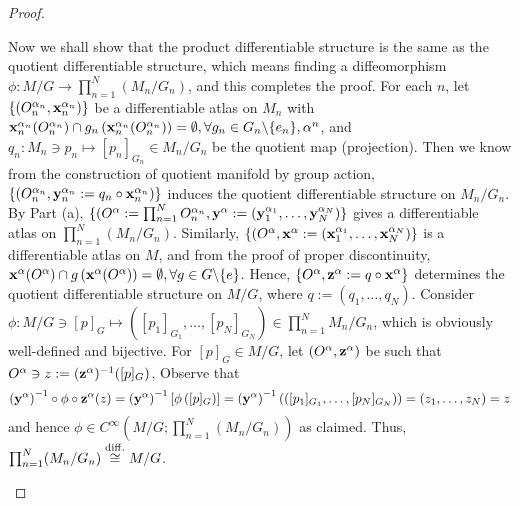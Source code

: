 {\begin{proof}
\begin{enumerate}[(a)]
	Now we shall show that the product differentiable structure is the same as the quotient differentiable structure, which means finding a diffeomorphism $\phi: M/G \rightarrow \prod_{n=1}^N (M_n/G_n)$, and this completes the proof. For each $n$, let $\{(O_n^{\alpha_n}, \mathbf{x}_n^{\alpha_n})\}$ be a differentiable atlas on $M_n$ with	$ \mathbf{x}_n^{\alpha_n}(O_n^{\alpha_n}) \cap g_n\left(\mathbf{x}_n^{\alpha_n}(O_n^{\alpha_n})\right) = \emptyset, \forall g_n \in G_n\backslash\{e_n\}, \alpha^n$, and ${ q_n: M_n \ni p_n \mapsto [p_n]_{G_n} \in M_n/G_n }$ be the quotient map (projection). Then we know from the construction of quotient manifold by group action, $\{(O_n^{\alpha_n}, \mathbf{y}_n^{\alpha_n}:= q_n \circ \mathbf{x}_n^{\alpha_n})\}$ induces the quotient differentiable structure on $M_n/G_n$. By Part (a), $\{(O^\alpha:= \prod_{n=1}^N O_n^{\alpha_n}, \mathbf{y}^\alpha:= (\mathbf{y}_1^{\alpha_1}, \dots, \mathbf{y}_N^{\alpha_N})\}$ gives a differentiable atlas on $\prod_{n=1}^N (M_n/G_n)$. Similarly, ${ \{(O^{\alpha}, \mathbf{x}^{\alpha}:= (\mathbf{x}_1^{\alpha_1}, \dots, \mathbf{x}_N^{\alpha_N})\} }$ is a differentiable atlas on $M$, and from the proof of proper discontinuity, ${ \mathbf{x}^\alpha(O^\alpha) \cap g\left(\mathbf{x}^\alpha(O^\alpha)\right) = \emptyset }, { \forall g \in G\backslash\{e\} }$. Hence, ${ \{O^\alpha, \mathbf{z}^\alpha:= q \circ \mathbf{x}^\alpha\} }$ determines the quotient differentiable structure on $M/G$, where ${ q:= (q_1, \dots, q_N) }$. Consider ${ \phi:M/G \ni [p]_G \mapsto ([p_1]_{G_1}, \dots, [p_N]_{G_N}) \in \prod_{n=1}^N M_n/G_n }$, which is obviously well-defined and bijective. For $[p]_G \in M/G$, let ${ (O^\alpha, \mathbf{z}^\alpha) }$ be such that ${ O^\alpha \ni z:=(\mathbf{z}^\alpha)^{-1}([p]_G) }$, Observe that 
	\[ \left( \mathbf{y}^\alpha \right)^{-1} \circ \phi \circ \mathbf{z}^\alpha (z) 
	= \left( \mathbf{y}^\alpha \right)^{-1} \left[ \phi \left([p]_G\right) \right]
	= \left( \mathbf{y}^\alpha \right)^{-1}\left(([p_1]_{G_1}, \dots, [p_N]_{G_N})\right)
	= (z_1, \dots, z_N) = z
	\]
	and hence ${ \phi \in C^\infty(M/G;\prod_{n=1}^N (M_n/G_n)) }$ as claimed. Thus, ${ \prod_{n=1}^N (M_n/G_n) \stackrel{\mathrm{diff.}}{\cong} M/G }$.
	
\end{enumerate}
\end{proof}

}